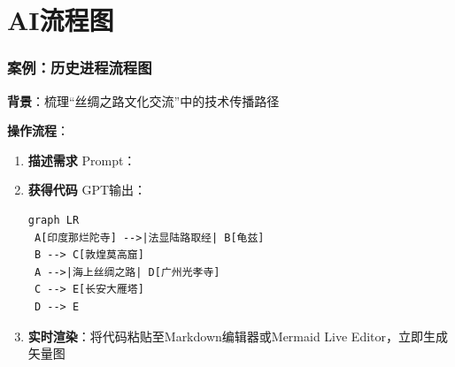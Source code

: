 \hypertarget{ux6848ux4f8b2ux5386ux53f2ux8fdbux7a0bux6d41ux7a0bux56fe}{%
\section{AI流程图}
\subsubsection{案例：历史进程流程图}\label{ux6848ux4f8b2ux5386ux53f2ux8fdbux7a0bux6d41ux7a0bux56fe}}

\textbf{背景}：梳理``丝绸之路文化交流''中的技术传播路径

\textbf{操作流程}：

\begin{enumerate}
\def\labelenumi{\arabic{enumi}.}
\item
  \textbf{描述需求}
  Prompt：
\item
  \textbf{获得代码} GPT输出：
  
\begin{gptbox}
\small{
\begin{lstlisting}
graph LR
 A[印度那烂陀寺] -->|法显陆路取经| B[龟兹]
 B --> C[敦煌莫高窟]
 A -->|海上丝绸之路| D[广州光孝寺]
 C --> E[长安大雁塔]
 D --> E
\end{lstlisting}
}
\end{gptbox}

\item
  \textbf{实时渲染}：将代码粘贴至Markdown编辑器或Mermaid Live
  Editor，立即生成矢量图
\end{enumerate}